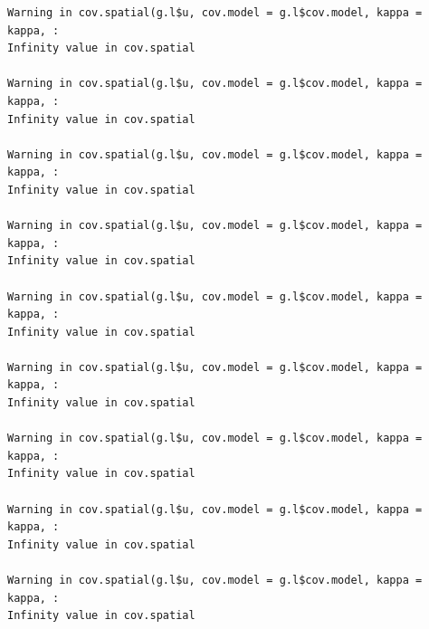 \documentclass[
  letterpaper,
  DIV=11,
  numbers=noendperiod]{scrartcl}
\newenvironment{Shaded}{\begin{snugshade}}{\end{snugshade}}
\newcommand{\DecValTok}[1]{\textcolor[rgb]{0.68,0.00,0.00}{#1}}
\newcommand{\NormalTok}[1]{\textcolor[rgb]{0.00,0.23,0.31}{#1}}
\newcommand{\OtherTok}[1]{\textcolor[rgb]{0.00,0.23,0.31}{#1}}
\newcommand{\SpecialCharTok}[1]{\textcolor[rgb]{0.37,0.37,0.37}{#1}}
\newcommand{\StringTok}[1]{\textcolor[rgb]{0.13,0.47,0.30}{#1}}
\begin{document}
\begin{verbatim}
Warning in cov.spatial(g.l$u, cov.model = g.l$cov.model, kappa = kappa, :
Infinity value in cov.spatial

Warning in cov.spatial(g.l$u, cov.model = g.l$cov.model, kappa = kappa, :
Infinity value in cov.spatial

Warning in cov.spatial(g.l$u, cov.model = g.l$cov.model, kappa = kappa, :
Infinity value in cov.spatial

Warning in cov.spatial(g.l$u, cov.model = g.l$cov.model, kappa = kappa, :
Infinity value in cov.spatial

Warning in cov.spatial(g.l$u, cov.model = g.l$cov.model, kappa = kappa, :
Infinity value in cov.spatial

Warning in cov.spatial(g.l$u, cov.model = g.l$cov.model, kappa = kappa, :
Infinity value in cov.spatial

Warning in cov.spatial(g.l$u, cov.model = g.l$cov.model, kappa = kappa, :
Infinity value in cov.spatial

Warning in cov.spatial(g.l$u, cov.model = g.l$cov.model, kappa = kappa, :
Infinity value in cov.spatial

Warning in cov.spatial(g.l$u, cov.model = g.l$cov.model, kappa = kappa, :
Infinity value in cov.spatial
\end{verbatim}

\begin{Shaded}
\end{Shaded}
\end{document}

